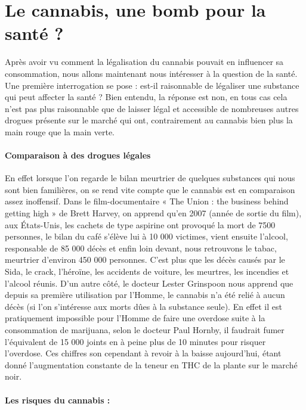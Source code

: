 \section{Le cannabis, une bomb pour la santé ?}

Après avoir vu comment la légalisation du cannabis pouvait en influencer sa consommation, nous allons maintenant nous intéresser à la question de la santé. Une première interrogation se pose : est-il raisonnable de légaliser une substance qui peut affecter la santé ? Bien entendu, la réponse est non, en tous cas cela n’est pas plus raisonnable que de laisser légal et accessible de nombreuses autres drogues présente sur le marché qui ont, contrairement au cannabis bien plus la main rouge que la main verte.

\paragraph{Comparaison à des drogues légales}

En effet lorsque l’on regarde le bilan meurtrier de quelques substances qui nous sont bien familières, on se rend vite compte que le cannabis est en comparaison assez inoffensif. Dans le film-documentaire « The Union : the business behind getting high » de Brett Harvey, on apprend qu’en 2007 (année de sortie du film), aux États-Unis, les cachets de type aspirine ont provoqué la mort de 7500 personnes, le bilan du café s’élève lui à 10 000 victimes, vient ensuite l’alcool, responsable de  85 000 décès et enfin loin devant, nous retrouvons le tabac, meurtrier d’environ 450 000 personnes. C’est plus que les décès causés par le Sida, le crack, l’héroïne, les accidents de voiture, les meurtres, les incendies et l’alcool réunis. D’un autre côté, le docteur Lester Grinspoon nous apprend que depuis sa première utilisation par l’Homme, le cannabis n’a été relié à aucun décès (si l’on s’intéresse aux morts dûes à la substance seule). En effet il est pratiquement impossible pour l’Homme de faire une overdose suite à la consommation de marijuana, selon le docteur Paul Hornby, il faudrait fumer l’équivalent de 15 000 joints en à peine plus de 10 minutes pour risquer l’overdose. Ces chiffres son cependant à revoir à la baisse aujourd’hui, étant donné l’augmentation constante de la teneur en THC de la plante sur le marché noir. 

\paragraph{Les risques du cannabis :}

